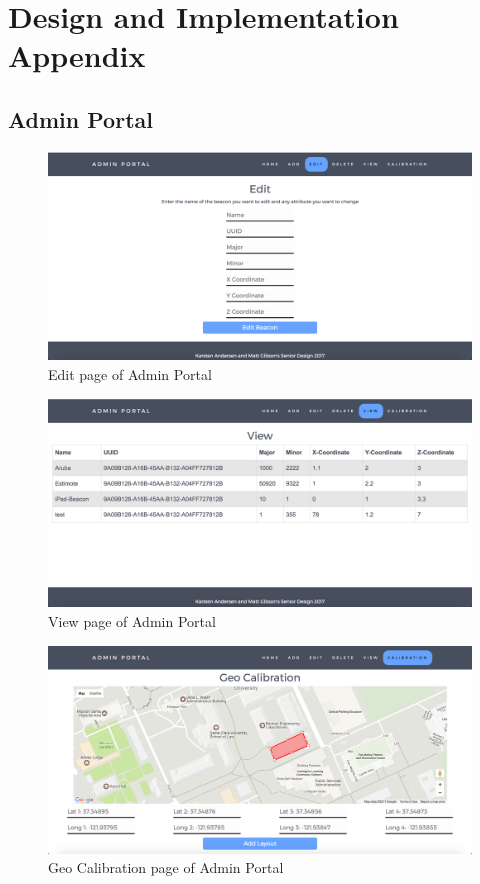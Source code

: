 \appendix

\chapter{Design and Implementation Appendix}
\section{Admin Portal}
\begin{figure}[h]
\includegraphics[width=1\textwidth]{images/editAdmin.png}
\caption{Edit page of Admin Portal}
\end{figure}

\newpage

\begin{figure}[h]
\includegraphics[width=1\textwidth]{images/viewAdmin.png}
\caption{View page of Admin Portal}
\end{figure}

\newpage

\begin{figure}[h]
\includegraphics[width=1\textwidth]{images/geoAdmin.png}
\caption{Geo Calibration page of Admin Portal}
\end{figure}

